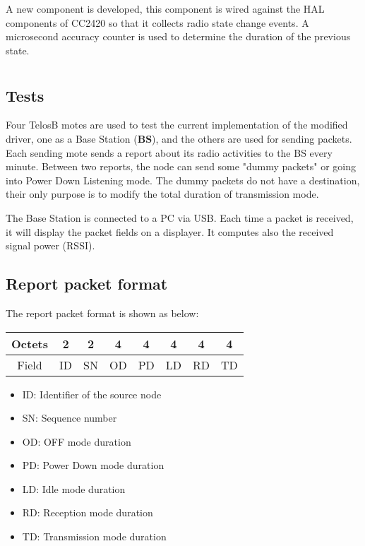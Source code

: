 \documentclass[a4paper,11pt]{article}
\begin{document}
A new component is developed, this component is wired against the HAL components of CC2420 so that it collects radio state change events. A microsecond accuracy counter is used to determine the duration of the previous state. 


\section{}

  \subsection{Tests}


Four TelosB motes are used to test the current implementation of the modified driver, one as a Base Station (\textbf{BS}), and the others are used for sending packets. Each sending mote sends a report about its radio activities to the BS every minute. Between two reports, the node can send some "dummy packets" or going into Power Down Listening mode.
The dummy packets do not have a destination, their only purpose is to modify the total duration of transmission mode.

The Base Station is connected to a PC via USB. Each time a packet is received, it will display the packet fields on a displayer. It computes also the received signal power (RSSI). 


  \subsection{Report packet format}


The report packet format is shown as below:

  \begin{tabular}{|c|c|c|c|c|c|c|c|}
    \hline
    Octets & 2 & 2 & 4 & 4 & 4 & 4 & 4 \\
    \hline
    Field & ID & SN & OD & PD & LD & RD & TD \\
    \hline
  \end{tabular}

  \begin{itemize}
    \item ID: Identifier of the source node
    \item SN: Sequence number
    \item OD: OFF mode duration
    \item PD: Power Down mode duration
    \item LD: Idle mode duration
    \item RD: Reception mode duration
    \item TD: Transmission mode duration
  \end{itemize}
\end{document}
